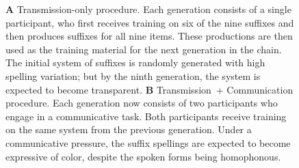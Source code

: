 \documentclass[doc,biblatex]{apa7}
\begin{document}
	\begin{figure}
	\vspace*{2pt}
	\caption{\textbf{A} Transmission-only procedure. Each generation consists of a single participant, who first receives training on six of the nine suffixes and then produces suffixes for all nine items. These productions are then used as the training material for the next generation in the chain. The initial system of suffixes is randomly generated with high spelling variation; but by the ninth generation, the system is expected to become transparent. \textbf{B} Transmission~+ Communication procedure. Each generation now consists of two participants who engage in a communicative task. Both participants receive training on the same system from the previous generation. Under a communicative pressure, the suffix spellings are expected to become expressive of color, despite the spoken forms being homophonous.}
	\label{fig03}
	\end{figure}
\end{document}
